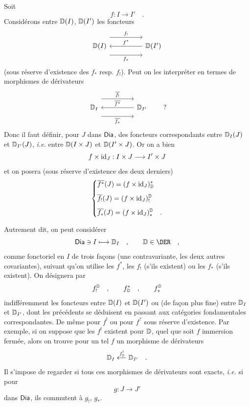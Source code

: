 Soit
\[
f : I \longrightarrow I' \quad .
\]
Considérons entre $\mathbb{D}(I)$, $\mathbb{D}(I')$ les foncteurs
\[
\begin{tikzcd}[column sep=huge]
\D(I) \arrow[r, shift left=3ex, "f_!"] \arrow[r, shift right=3ex, "f_*"'] & \D(I') \arrow[l, "f^*"']
\end{tikzcd}
\]
(sous réserve d'existence des $f_*$ resp. $f_!$). Peut on les interpréter en termes de morphismes de dérivateurs
\[
\begin{tikzcd}[column sep=huge]
\D_I \arrow[r, shift left=3ex, "\overline{f_!}"] \arrow[r, shift right=3ex, "\overline{f_*}"'] & \D_{I'} \arrow[l, "\overline{f^*}"']
\end{tikzcd}
\qquad ?
\]
Donc il faut définir, pour $J$ dans $\mathsf{Dia}$, des foncteurs correspondants entre $\mathbb{D}_I(J)$ et $\mathbb{D}_{I'}(J)$, \textit{i.e.} entre $\mathbb{D}(I \times J)$ et $\mathbb{D}(I' \times J)$. Or on a bien
\[
f \times \mathrm{id}_J : I \times J \longrightarrow I' \times J
\]
et on posera (sous réserve d'existence des deux derniers)
\[
\left\{
\begin{aligned}
&\overline{f^*}(J) = (f \times \mathrm{id}_J)^*_{\mathbb{D}} \\[1ex]
&\overline{f_!}(J) = (f \times \mathrm{id}_J)^{\mathbb{D}}_! \\[1ex]
&\overline{f_*}(J) = (f \times \mathrm{id}_J)^{\mathbb{D}}_* \quad .
\end{aligned}
\right.
\]


Autrement dit, on peut considérer
\[
\Dia \ni I \longmapsto \D_I \quad , \qquad \D \in \DER \quad ,
\]
comme fonctoriel en $I$ de trois façons (une contravariante, les deux autres covariantes), suivant qu'on utilise les $f^*$, les $f_!$ (s'ils existent) ou les $f_*$ (s'ils existent). On désignera par
\[
f^{\mathbb{D}}_! \quad , \qquad f^*_{\mathbb{D}} \quad , \qquad f^{\mathbb{D}}_*
\]
indifféremment les foncteurs entre $\mathbb{D}(I)$ et $\mathbb{D}(I')$ ou (de façon plus fine) entre $\mathbb{D}_I$ et $\mathbb{D}_{I'}$, dont les précédents se déduisent en passant aux catégories fondamentales correspondantes. De même pour $f^!$ ou pour $f^?$ sous réserve d'existence. Par exemple, si on suppose que les $f^!$ existent pour $\mathbb{D}$, quel que soit $f$ immersion fermée, alors on trouve pour un tel $f$ un morphisme de dérivateurs
\[
\mathbb{D}_I \xleftarrow{f^!_{\mathbb{D}}} \mathbb{D}_{I'} \quad .
\]
Il s'impose de regarder si tous ces morphismes de dérivateurs sont exacts, \textit{i.e.} si pour
\[
g : J \longrightarrow J'
\]
dans $\mathsf{Dia}$, ils commutent à $g_!$, $g_*$.



